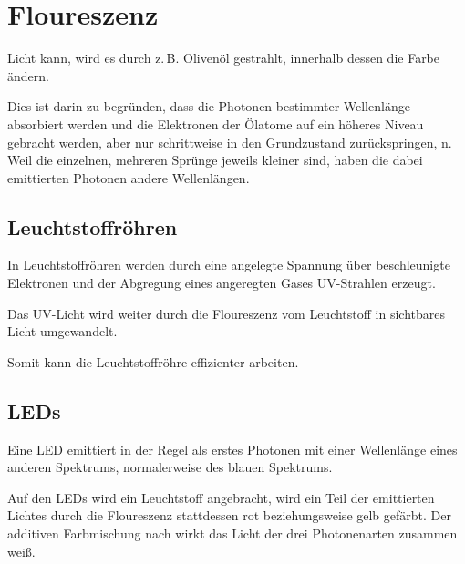 \documentclass{article}
\begin{document}
\section{Floureszenz}
Licht kann, wird es durch z.\,B. Olivenöl gestrahlt, innerhalb dessen die Farbe ändern.
 
Dies ist darin zu begründen, dass die Photonen bestimmter Wellenlänge absorbiert werden und die Elektronen der Ölatome auf ein höheres Niveau gebracht werden, aber nur schrittweise in den Grundzustand zurückspringen, n. Weil die einzelnen, mehreren Sprünge jeweils kleiner sind, haben die dabei emittierten Photonen andere Wellenlängen. 
 
\subsection{Leuchtstoffröhren} 
In Leuchtstoffröhren werden durch eine angelegte Spannung über beschleunigte Elektronen und der Abgregung eines angeregten Gases UV-Strahlen erzeugt.
 
Das UV-Licht wird weiter durch die Floureszenz vom Leuchtstoff in sichtbares Licht umgewandelt.
 
Somit kann die Leuchtstoffröhre effizienter arbeiten. 
 
\subsection{ LEDs}
Eine  LED emittiert in der Regel als erstes Photonen mit einer Wellenlänge eines anderen Spektrums, normalerweise des blauen Spektrums.
 
Auf den LEDs wird ein Leuchtstoff angebracht, wird ein Teil der emittierten Lichtes durch die Floureszenz stattdessen rot beziehungsweise gelb gefärbt. Der additiven Farbmischung nach wirkt das Licht der drei Photonenarten zusammen weiß.
\end{document}

